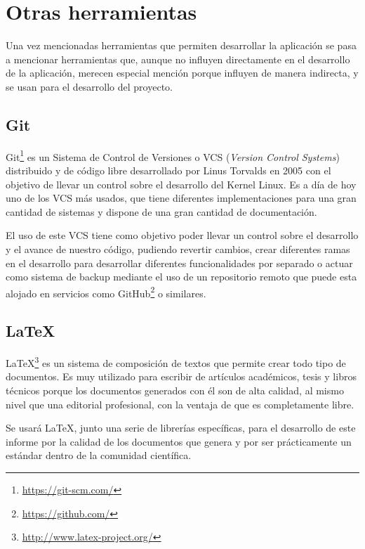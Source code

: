 
\section{Otras herramientas}

Una vez mencionadas herramientas que permiten desarrollar la aplicación se pasa a mencionar herramientas que, aunque no influyen directamente en el desarrollo de la aplicación, merecen especial mención porque influyen de manera indirecta, y se usan para el desarrollo del proyecto.

\subsection{Git}

Git\footnote{\url{https://git-scm.com/}} es un Sistema de Control de Versiones o VCS (\textit{Version Control Systems}) distribuido y de código libre desarrollado por Linus Torvalds en 2005 con el objetivo de llevar un control sobre el desarrollo del Kernel Linux. Es a día de hoy uno de los VCS más usados, que tiene diferentes implementaciones para una gran cantidad de sistemas y dispone de una gran cantidad de documentación. 

El uso de este VCS tiene como objetivo poder llevar un control sobre el desarrollo y el avance de nuestro código, pudiendo revertir cambios, crear diferentes ramas en el desarrollo para desarrollar diferentes funcionalidades por separado o actuar como sistema de backup mediante el uso de un repositorio remoto que puede esta alojado en servicios como GitHub\footnote{\url{https://github.com/}} o similares.

\subsection{\LaTeX}

LaTeX\footnote{\url{http://www.latex-project.org/}}  es un sistema de composición de textos que permite crear todo tipo de documentos. Es muy utilizado para escribir de artículos académicos, tesis y libros técnicos porque los documentos generados con él son de alta calidad, al mismo nivel que una editorial profesional, con la ventaja de que es completamente libre.

Se usará LaTeX, junto una serie de librerías específicas, para el desarrollo de este informe por la calidad de los documentos que genera y por ser prácticamente un estándar dentro de la comunidad científica. 
